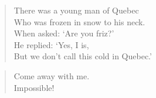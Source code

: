 \documentclass{memoir}
\begin{document}
\begin{verse}
\begin{patverse}
There was a young man of Quebec \\
Who was frozen in snow to his neck. \\
When asked: `Are you friz?' \\
He replied: `Yes, I is, \\
But we don't call this cold in Quebec.'
\end{patverse}
\end{verse}

\begin{verse}
Come away with me. \\
 Impossible!
\end{verse}
\end{document}
